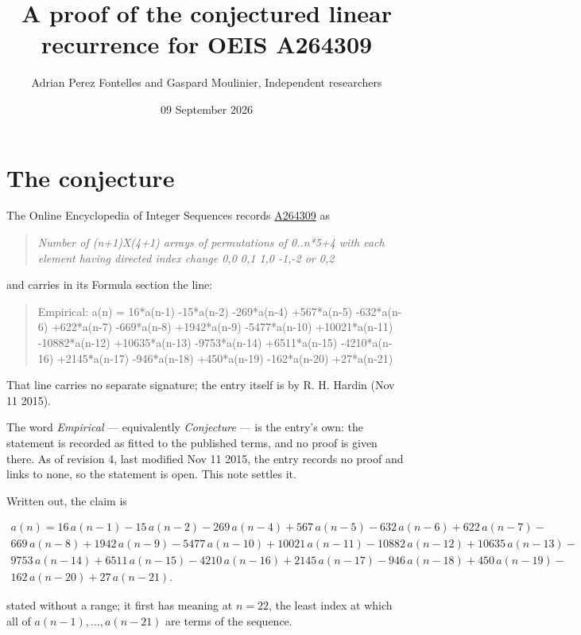 \documentclass[11pt]{article}
\title{A proof of the conjectured linear recurrence for OEIS A264309}
\author{Adrian Perez Fontelles and Gaspard Moulinier, Independent researchers}
\date{09 September 2026}
\theoremstyle{definition}
\begin{document}
\maketitle
\section{The conjecture}

The Online Encyclopedia of Integer Sequences records \href{https://oeis.org/A264309}{A264309} as

\begin{quote}\itshape Number of (n+1)X(4+1) arrays of permutations of 0..n*5+4 with each element having directed index change 0,0 0,1 1,0 -1,-2 or 0,2\end{quote}

and carries in its Formula section the line:

\begin{quote}\ttfamily Empirical: a(n) = 16*a(n-1) -15*a(n-2) -269*a(n-4) +567*a(n-5) -632*a(n-6) +622*a(n-7) -669*a(n-8) +1942*a(n-9) -5477*a(n-10) +10021*a(n-11) -10882*a(n-12) +10635*a(n-13) -9753*a(n-14) +6511*a(n-15) -4210*a(n-16) +2145*a(n-17) -946*a(n-18) +450*a(n-19) -162*a(n-20) +27*a(n-21)\end{quote}

That line carries no separate signature; the entry itself is by R. H. Hardin (Nov 11 2015).

The word {\itshape Empirical} --- equivalently {\itshape Conjecture} --- is the entry's own: the statement is recorded as fitted to the published terms, and no proof is given there. As of revision 4, last modified Nov 11 2015, the entry records no proof and links to none, so the statement is open. This note settles it.

Written out, the claim is

\begin{multline*} a(n) = 16\,a(n-1) - 15\,a(n-2) - 269\,a(n-4) + 567\,a(n-5) - 632\,a(n-6) + 622\,a(n-7) - \\ 669\,a(n-8) + 1942\,a(n-9) - 5477\,a(n-10) + 10021\,a(n-11) - 10882\,a(n-12) + 10635\,a(n-13) - \\ 9753\,a(n-14) + 6511\,a(n-15) - 4210\,a(n-16) + 2145\,a(n-17) - 946\,a(n-18) + 450\,a(n-19) - \\ 162\,a(n-20) + 27\,a(n-21). \end{multline*}

stated without a range; it first has meaning at $n = 22$, the least index at which all of $a(n-1),\dots,a(n-21)$ are terms of the sequence.
\end{document}
